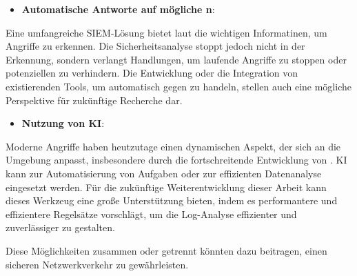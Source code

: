 \begin{itemize}[noitemsep]
    \item \textbf{Automatische Antworte auf mögliche n}:
\end{itemize}

Eine umfangreiche \gls{SIEM}-Lösung bietet laut \cite{Mohammed_NOC} die wichtigen Informatinen, um Angriffe zu erkennen. Die Sicherheitsanalyse stoppt jedoch nicht in der Erkennung, sondern verlangt Handlungen, um laufende Angriffe zu stoppen oder potenziellen zu verhindern. Die Entwicklung oder die Integration von existierenden Tools, um automatisch gegen  zu handeln, stellen auch eine mögliche Perspektive für zukünftige Recherche dar.

\begin{itemize}[noitemsep]
    \item \textbf{Nutzung von \gls{KI}}:
\end{itemize}

Moderne Angriffe haben heutzutage einen dynamischen Aspekt, der sich an die Umgebung anpasst, insbesondere durch die fortschreitende Entwicklung von  \citep{Guembe_AIHACKER}. \gls{KI} kann zur Automatisierung von Aufgaben oder zur effizienten Datenanalyse eingesetzt werden. Für die zukünftige Weiterentwicklung dieser Arbeit kann dieses Werkzeug eine große Unterstützung bieten, indem es performantere und effizientere Regelsätze vorschlägt, um die Log-Analyse effizienter und zuverlässiger zu gestalten. 

Diese Möglichkeiten zusammen oder getrennt könnten dazu beitragen, einen sicheren Netzwerkverkehr zu gewährleisten.